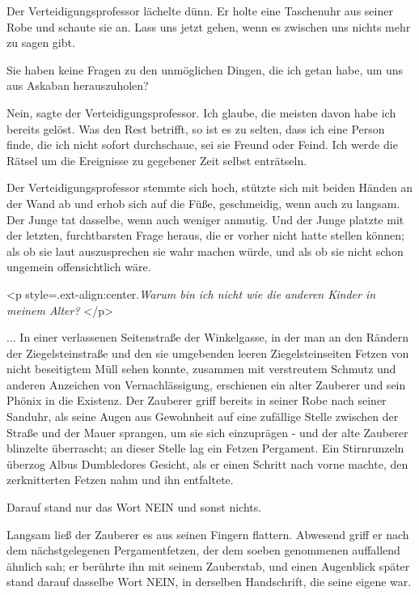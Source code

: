 Der Verteidigungsprofessor lächelte dünn. Er holte eine Taschenuhr aus seiner
Robe und schaute sie an. \glqq Lass uns jetzt gehen, wenn es zwischen uns nichts
mehr zu sagen gibt.\grqq{}

\glqq Sie haben keine Fragen zu den unmöglichen Dingen, die ich getan habe, um
uns aus Askaban herauszuholen?\grqq{}

\glqq Nein\grqq{}, sagte der Verteidigungsprofessor. \glqq Ich glaube, die
meisten davon habe ich bereits gelöst. Was den Rest betrifft, so ist es zu
selten, dass ich eine Person finde, die ich nicht sofort durchschaue, sei sie
Freund oder Feind. Ich werde die Rätsel um die Ereignisse zu gegebener Zeit
selbst enträtseln.\grqq{}

Der Verteidigungsprofessor stemmte sich hoch, stützte sich mit beiden Händen an
der Wand ab und erhob sich auf die Füße, geschmeidig, wenn auch zu langsam. Der
Junge tat dasselbe, wenn auch weniger anmutig. Und der Junge platzte mit der
letzten, furchtbarsten Frage heraus, die er vorher nicht hatte stellen können;
als ob sie laut auszusprechen sie wahr machen würde, und als ob sie nicht schon
ungemein offensichtlich wäre.

<p style=\grqq{}.ext-align:center\grqq{}.\emph{\glqq Warum bin ich nicht wie die
anderen Kinder in meinem Alter?\grqq{} }</p>

... In einer verlassenen Seitenstraße der Winkelgasse, in der man an den Rändern
der Ziegelsteinstraße und den sie umgebenden leeren Ziegelsteinseiten Fetzen von
nicht beseitigtem Müll sehen konnte, zusammen mit verstreutem Schmutz und
anderen Anzeichen von Vernachlässigung, erschienen ein alter Zauberer und sein
Phönix in die Existenz. Der Zauberer griff bereits in seiner Robe nach seiner
Sanduhr, als seine Augen aus Gewohnheit auf eine zufällige Stelle zwischen der
Straße und der Mauer sprangen, um sie sich einzuprägen - und der alte Zauberer
blinzelte überrascht; an dieser Stelle lag ein Fetzen Pergament. Ein
Stirnrunzeln überzog Albus Dumbledores Gesicht, als er einen Schritt nach vorne
machte, den zerknitterten Fetzen nahm und ihn entfaltete.

Darauf stand nur das Wort \glqq NEIN\grqq{} und sonst nichts.

Langsam ließ der Zauberer es aus seinen Fingern flattern. Abwesend griff er nach
dem nächstgelegenen Pergamentfetzen, der dem soeben genommenen auffallend
ähnlich sah; er berührte ihn mit seinem Zauberstab, und einen Augenblick später
stand darauf dasselbe Wort \glqq NEIN\grqq{}, in derselben Handschrift, die
seine eigene war.

